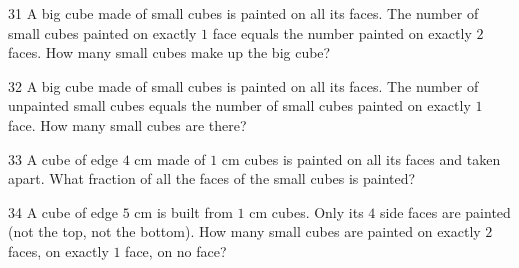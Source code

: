 \begin{probbox}{31}{}
A big cube made of small cubes is painted on all its faces. The number of small cubes painted on exactly $1$ face equals the number painted on exactly $2$ faces. How many small cubes make up the big cube?
\end{probbox}
\gap
\begin{probbox}{32}{}
A big cube made of small cubes is painted on all its faces. The number of unpainted small cubes equals the number of small cubes painted on exactly $1$ face. How many small cubes are there?
\end{probbox}
\gap
\begin{probbox}{33}{}
A cube of edge $4$ cm made of $1$ cm cubes is painted on all its faces and taken apart. What fraction of all the faces of the small cubes is painted?
\end{probbox}
\gap
\begin{probbox}{34}{}
A cube of edge $5$ cm is built from $1$ cm cubes. Only its $4$ side faces are painted (not the top, not the bottom). How many small cubes are painted on exactly $2$ faces, on exactly $1$ face, on no face?
\end{probbox}
